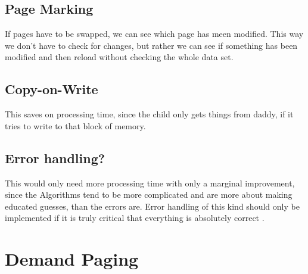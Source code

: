\documentclass[a4paper, 11pt]{article}
\begin{document}
    \subsection{Page Marking}
    If pages have to be swapped, we can see which page has meen modified. This way we don't have to check for changes, but rather we can see if something has been modified and then reload without checking the whole data set.

    \subsection{Copy-on-Write}
    This saves on processing time, since the child only gets things from daddy, if it tries to write to that block of memory.

    \subsection{Error handling?}
    This would only need more processing time with only a marginal improvement, since the Algorithms tend to be more complicated and are more about making educated guesses, than the errors are.
    Error handling of this kind should only be implemented if it is truly critical that everything is absolutely correct . 
    \newpage
    \section{Demand Paging}
\end{document}
